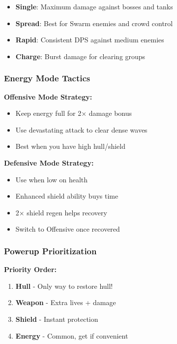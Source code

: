 \documentclass[11pt,a4paper]{article}
\begin{document}
\begin{itemize}[leftmargin=*]
    \item \textbf{Single}: Maximum damage against bosses and tanks
    \item \textbf{Spread}: Best for Swarm enemies and crowd control
    \item \textbf{Rapid}: Consistent DPS against medium enemies
    \item \textbf{Charge}: Burst damage for clearing groups
\end{itemize}

\subsubsection{Energy Mode Tactics}

\begin{tcolorbox}[mybox]
\textbf{Offensive Mode Strategy:}
\begin{itemize}[nosep]
    \item Keep energy full for 2× damage bonus
    \item Use devastating attack to clear dense waves
    \item Best when you have high hull/shield
\end{itemize}

\textbf{Defensive Mode Strategy:}
\begin{itemize}[nosep]
    \item Use when low on health
    \item Enhanced shield ability buys time
    \item 2× shield regen helps recovery
    \item Switch to Offensive once recovered
\end{itemize}
\end{tcolorbox}

\subsubsection{Powerup Prioritization}

\textbf{Priority Order:}
\begin{enumerate}[nosep]
    \item \textcolor{red}{\faHeart} \textbf{Hull} - Only way to restore hull!
    \item \textcolor{orange}{\faStar} \textbf{Weapon} - Extra lives + damage
    \item \textcolor{cyan}{\faShield} \textbf{Shield} - Instant protection
    \item \textcolor{yellow}{\faLightbulb} \textbf{Energy} - Common, get if convenient
\end{enumerate}
\end{document}
